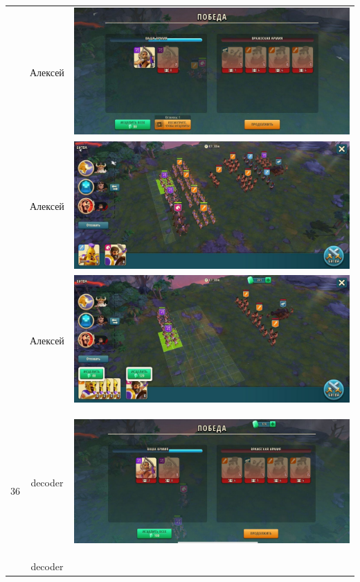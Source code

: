 \begin{longtable}{|c|c|c|}
	& Алексей &
	\includegraphics[width=0.75\linewidth]{./parts/media/TreasureHunt/36/alexey/photo_2022-04-15_11-02-55.jpg} \\
	& Алексей &
	\includegraphics[width=0.75\linewidth]{./parts/media/TreasureHunt/36/alexey/photo_2022-04-15_11-02-05.jpg} \\
	& Алексей &
	\includegraphics[width=0.75\linewidth]{./parts/media/TreasureHunt/36/alexey/photo_2022-04-15_11-02-50.jpg} \\
	\hline
	\multirow{12}{*}{36} & decoder &
	\hypertarget{fight36}{\includegraphics[width=0.75\linewidth]{./parts/media/TreasureHunt/36/decoder/photo_2022-04-07_10-07-36.jpg}} \\
	& decoder &

\end{longtable}
